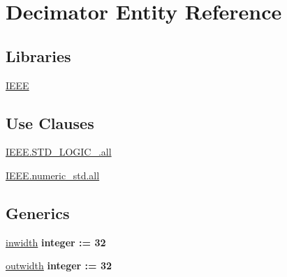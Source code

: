 \hypertarget{class_decimator}{\section{Decimator Entity Reference}
\label{class_decimator}
}
\subsection*{Libraries}
 \begin{DoxyCompactItemize}
\item 
\hypertarget{class_decimator_ab0584479b5040cef00a18bee1b8532fe}{\hyperlink{class_decimator_ab0584479b5040cef00a18bee1b8532fe}{I\-E\-E\-E} }\label{class_decimator_ab0584479b5040cef00a18bee1b8532fe}

\end{DoxyCompactItemize}
\subsection*{Use Clauses}
 \begin{DoxyCompactItemize}
\item 
\hypertarget{class_decimator_a2392e2f75b4d6bf892e35a89192802eb}{\hyperlink{class_decimator_a2392e2f75b4d6bf892e35a89192802eb}{I\-E\-E\-E.\-S\-T\-D\-\_\-\-L\-O\-G\-I\-C\-\_.\-all}   }\label{class_decimator_a2392e2f75b4d6bf892e35a89192802eb}

\item 
\hypertarget{class_decimator_a5dc1cd66829f0354df388c1d28922cf0}{\hyperlink{class_decimator_a5dc1cd66829f0354df388c1d28922cf0}{I\-E\-E\-E.\-numeric\-\_\-std.\-all}   }\label{class_decimator_a5dc1cd66829f0354df388c1d28922cf0}

\end{DoxyCompactItemize}
\subsection*{Generics}
 \begin{DoxyCompactItemize}
\item 
\hypertarget{class_decimator_a1ab3afaa6b417b67a75464cb8a29722c}{\hyperlink{class_decimator_a1ab3afaa6b417b67a75464cb8a29722c}{inwidth} {\bfseries {\bfseries \textcolor{comment}{integer}\textcolor{vhdlchar}{ }\textcolor{vhdlchar}{\-:}\textcolor{vhdlchar}{=}\textcolor{vhdlchar}{ } \textcolor{vhdldigit}{32} \textcolor{vhdlchar}{ }}}}\label{class_decimator_a1ab3afaa6b417b67a75464cb8a29722c}

\item 
\hypertarget{class_decimator_a09c27ff9dece2d9124141c7f235ef28d}{\hyperlink{class_decimator_a09c27ff9dece2d9124141c7f235ef28d}{outwidth} {\bfseries {\bfseries \textcolor{comment}{integer}\textcolor{vhdlchar}{ }\textcolor{vhdlchar}{\-:}\textcolor{vhdlchar}{=}\textcolor{vhdlchar}{ } \textcolor{vhdldigit}{32} \textcolor{vhdlchar}{ }}}}\label{class_decimator_a09c27ff9dece2d9124141c7f235ef28d}

\end{DoxyCompactItemize}

